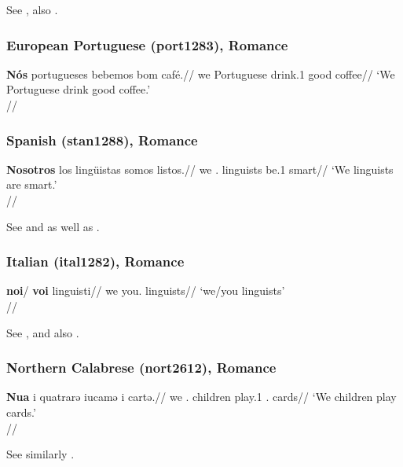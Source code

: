 See \citealp[560]{hoehn2015unagr}, also \citet[152, 301]{alvarezetal1986}.

\subsubsection{European Portuguese (port1283), Romance}

\ex 
\begingl
\gla \textbf{Nós} portugueses bebemos bom café.//
\glb we Portuguese drink.1\Pl{} good coffee//
\glft `We Portuguese drink good coffee.'\\\citep[555]{hoehn2015unagr}//
\endgl
\xe

\subsubsection{Spanish (stan1288), Romance}

\ex \begingl
\gla \textbf{Nosotros} los lingüistas somos listos.//
\glb we \Det.\Pl{} linguists be.1\Pl{} smart//
\glft `We linguists are smart.'\\\citep[210, (38a)]{choi2014phd}//
\endgl
\xe

See \citet[210f.]{choi2014phd} and \citet[560]{hoehn2015unagr} as well as \citet[145]{debruyne1995}.

\newpage

\subsubsection{Italian (ital1282), Romance}

\ex \begingl
\gla \textbf{noi}/ \textbf{voi} linguisti//
\glb we you.\Pl{} linguists//
\glft `we/you linguists'\\\citep[202, (21a)]{cardinaletti1994}//
\endgl
\xe

See \citet[202f.]{cardinaletti1994}, \citet[559]{hoehn2015unagr} and also \citet{hoehnetal2016CalabrUnagr,hoehnetalICGLcalabria}.

\subsubsection{Northern Calabrese (nort2612), Romance}

\ex \begingl
\gla \textbf{Nua} i quatrarə iucamə i cartə.//
\glb we \Det.\Pl{} children play.1\Pl{} \Det.\Pl{} cards//
\glft `We children play cards.'\\\citep[276, (23b)]{hoehnetalICGLcalabria}//
\endgl
\xe

See similarly \citet[142]{hoehnetal2016CalabrUnagr}.

